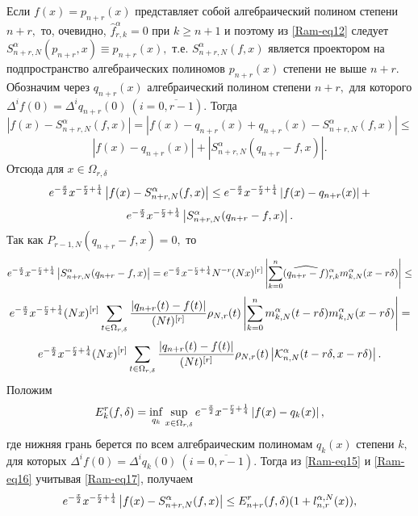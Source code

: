 Если $f(x)=p_{n+r}(x)$ представляет собой алгебраический полином степени $n+r,$ то, очевидно, $\hat{f}_{r,k}^\alpha=0$ при $k\geq n+1$ и поэтому из \eqref{Ram-eq12} следует  $S_{n+r,N}^\alpha(p_{n+r},x)\equiv p_{n+r}(x),$ т.е. $S_{n+r,N}^\alpha(f,x)$ является проектором на подпространство алгебраических полиномов $p_{n+r}(x)$ степени не выше $n+r.$
Обозначим через $q_{n+r}(x)$ алгебраический полином степени $n+r,$ для которого
$
\Delta^i f(0)=\Delta^i q_{n+r}(0)\ (i=\overline{0, r-1}).
$
Тогда
$$
\left|f(x)-S_{n+r,N}^\alpha(f,x)\right|=\left|f(x)-q_{n+r}(x)+q_{n+r}(x)-S_{n+r,N}^\alpha(f,x)\right|\leq
$$
$$
\left|f(x)-q_{n+r}(x)\right|+\left|S_{n+r,N}^\alpha(q_{n+r}-f,x)\right|.
$$
Отсюда для $x\in\Omega_{r,\delta}$
$$
e^{-{x\over 2}}x^{-{r\over 2}+{1\over 4}}\left|f(x)-S_{n+r,N}^\alpha(f,x)\right|\leq e^{-{x\over 2}}x^{-{r\over 2}+{1\over 4}}\left|f(x)-q_{n+r}(x)\right|+
$$
\begin{equation}\label{Ram-eq15}
e^{-{x\over 2}}x^{-{r\over 2}+{1\over 4}}\left|S_{n+r,N}^\alpha(q_{n+r}-f,x)\right|.
\end{equation}
Так как $P_{r-1,N}(q_{n+r}-f,x)=0,$ то
$$
e^{-{x\over 2}}x^{-{r\over 2}+{1\over 4}}\left|S_{n+r,N}^\alpha(q_{n+r}-f,x)\right|=
e^{-{x\over 2}}x^{-{r\over 2}+{1\over 4}}N^{-r}(Nx)^{[r]}\left|\sum_{k=0}^n(\widehat{q_{n+r}-f})_{r,k}^\alpha m_{k,N}^\alpha(x-r\delta)\right|\leq
$$
$$
e^{-{x\over 2}}x^{-{r\over 2}+{1\over 4}}(Nx)^{[r]}
\sum_{t\in\Omega_{r,\delta}}{|q_{n+r}(t)-f(t)|\over(Nt)^{[r]}}\rho_{N,r}(t)
\left|\sum_{k=0}^nm_{k,N}^\alpha(t-r\delta)m_{k,N}^\alpha(x-r\delta)\right|=
$$
\begin{equation}\label{Ram-eq16}
e^{-{x\over 2}}x^{-{r\over 2}+{1\over 4}}(Nx)^{[r]}\sum_{t\in\Omega_{r,\delta}}{|q_{n+r}(t)-f(t)|\over(Nt)^{[r]}}\rho_{N,r}(t)\left|
\mathcal{K}_{n,N}^\alpha(t-r\delta,x-r\delta)\right|.
\end{equation}
Положим
\begin{equation}\label{Ram-eq17}
E_{k}^r(f,\delta)=\inf_{q_{k}}\sup_{x\in\Omega_{r,\delta}} e^{-{x\over 2}}x^{-{r\over 2}+{1\over 4}}\left|f(x)-q_{k}(x)\right|,
\end{equation}
где нижняя грань берется по всем алгебраическим полиномам $q_{k}(x)$ степени $k,$ для которых $\Delta^i f(0)=\Delta^i q_{k}(0)\ (i=\overline{0, r-1}).$
Тогда из \eqref{Ram-eq15} и \eqref{Ram-eq16} учитывая \eqref{Ram-eq17}, получаем
\begin{equation}\label{Ram-eq18}
e^{-{x\over 2}}x^{-{r\over 2}+{1\over 4}}\left|f(x)-S_{n+r,N}^\alpha(f,x)\right|\leq E_{n+r}^r(f,\delta)(1+l_{n,r}^{\alpha,N}(x)),
\end{equation}
